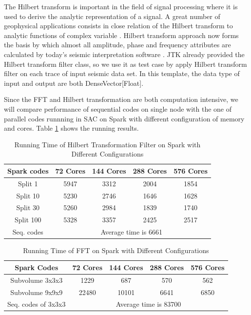 The Hilbert transform \cite{HilbertWiki} is important in the field of signal processing where it is used to derive the analytic representation of a signal. A great number of geophysical applications consists in close relation of the Hilbert transform to analytic functions of complex variable \cite{HilbertGeoApplication}. Hilbert transform approach now forms the basis by which almost all amplitude, phase and frequency attributes are calculated by today’s seismic interpretation software \cite{HilbertSeismic}. JTK already provided the Hilbert transform filter class, so we use it as test case by apply Hilbert transform filter on each trace of input seismic data set. In this template, the data type of input and output are both DenseVector[Float].  

Since the FFT and Hilbert transformation are both computation intensive, we will compare performance of sequential codes on single node with the one of parallel codes runnning in SAC on Spark with different configuration of memory and cores. Table \ref{table:HilbertSpark} shows the running results.


\begin{table}[h]
\caption{Running Time of Hilbert Transformation Filter on Spark with Different Configurations}
\centering
\begin{tabular}{||c| c c c c ||} 
 \hline
 Spark codes  & 72 Cores & 144 Cores & 288 Cores & 576 Cores \\ [0.5ex] 
 \hline
  Split 1   & 5947 & 3312 & 2004 & 1854 \\
  Split 10  & 5230 & 2746 & 1646 & 1628 \\
  Split 30  & 5260 & 2984 & 1839 & 1740 \\
  Split 100 & 5328 & 3357 & 2425 & 2517 \\
 \hline
 \hline
 Seq. codes & \multicolumn{4}{c||}{Average time is 6661} \\ 
 \hline
\end{tabular}
\label{table:HilbertSpark}
\end{table}

\begin{table}[h]
\caption{Running Time of FFT on Spark with Different Configurations}
\centering
\begin{tabular}{||c| c c c c ||} 
 \hline
 Spark Codes & 72 Cores & 144 Cores & 288 Cores & 576 Cores \\ [0.5ex] 
 \hline
 Subvolume 3x3x3 & 1229 & 687 & 570 & 562 \\ 
 Subvolume 9x9x9 & 22480 & 10101 & 6641 & 6850 \\ 
 \hline
 \hline
 Seq. codes of 3x3x3 & \multicolumn{4}{c||}{Average time is 83700 } \\ 
 \hline
 \end{tabular}
 \label{table:FFTSpark}
 \end{table}

